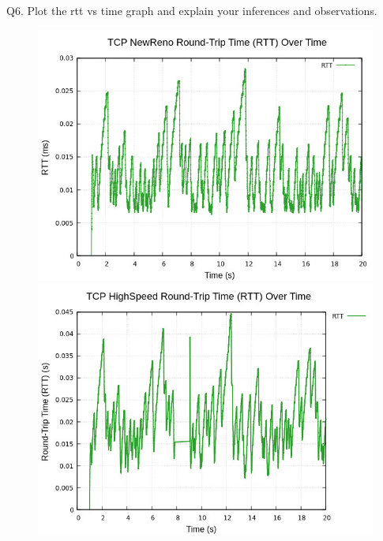 \documentclass[11pt,a4paper]{article}
\begin{document}
\begin{tcolorbox}[colback=purple!5!white, colframe=purple!75!black, fonttitle=\bfseries, title=Question-2partA-4]
    Q6. Plot the rtt vs time graph and explain your inferences and observations.
\end{tcolorbox}

\begin{figure}[h]
    \centering
    \begin{minipage}{0.48\textwidth}
    \centering
    \includegraphics[width=\textwidth]{images/newreno_rtt.jpg}
    \end{minipage}\hfill
    \begin{minipage}{0.48\textwidth}
    \centering
    \includegraphics[width=\textwidth]{images/hs-rtt.jpg}
    \end{minipage}
    \vspace{1em}
    

\end{figure}
\end{document}
